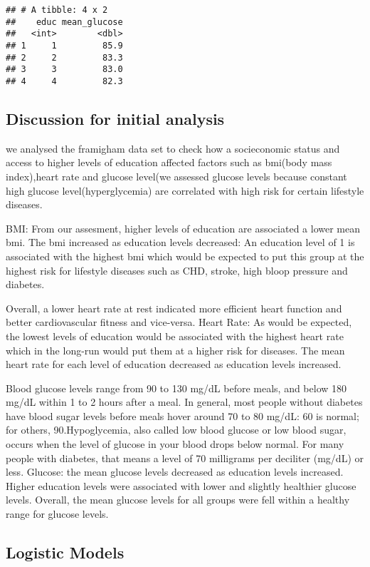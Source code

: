 \documentclass[]{article}
\begin{document}
\begin{verbatim}
## # A tibble: 4 x 2
##    educ mean_glucose
##   <int>        <dbl>
## 1     1         85.9
## 2     2         83.3
## 3     3         83.0
## 4     4         82.3
\end{verbatim}

\subsection{Discussion for initial
analysis}\label{discussion-for-initial-analysis}

we analysed the framigham data set to check how a socieconomic status
and access to higher levels of education affected factors such as
bmi(body mass index),heart rate and glucose level(we assessed glucose
levels because constant high glucose level(hyperglycemia) are correlated
with high risk for certain lifestyle diseases.

BMI: From our assesment, higher levels of education are associated a
lower mean bmi. The bmi increased as education levels decreased: An
education level of 1 is associated with the highest bmi which would be
expected to put this group at the highest risk for lifestyle diseases
such as CHD, stroke, high bloop pressure and diabetes.

Overall, a lower heart rate at rest indicated more efficient heart
function and better cardiovascular fitness and vice-versa. Heart Rate:
As would be expected, the lowest levels of education would be associated
with the highest heart rate which in the long-run would put them at a
higher risk for diseases. The mean heart rate for each level of
education decreased as education levels increased.

Blood glucose levels range from 90 to 130 mg/dL before meals, and below
180 mg/dL within 1 to 2 hours after a meal. In general, most people
without diabetes have blood sugar levels before meals hover around 70 to
80 mg/dL: 60 is normal; for others, 90.Hypoglycemia, also called low
blood glucose or low blood sugar, occurs when the level of glucose in
your blood drops below normal. For many people with diabetes, that means
a level of 70 milligrams per deciliter (mg/dL) or less. Glucose: the
mean glucose levels decreased as education levels increased. Higher
education levels were associated with lower and slightly healthier
glucose levels. Overall, the mean glucose levels for all groups were
fell within a healthy range for glucose levels.

\subsection{Logistic Models}\label{logistic-models}
\end{document}
